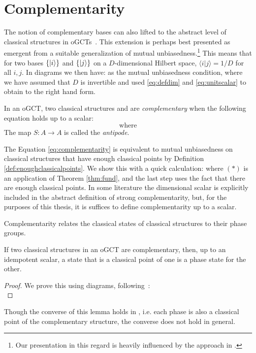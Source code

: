 \section{Complementarity}
The notion of complementary bases can also lifted to the abstract level of classical structures in oGCTs~\cite{coecke2011interacting}. This extension is perhaps best presented as emergent from a suitable generalization of mutual unbiasedness.\footnote{Our presentation in this regard is heavily influenced by the approach in \cite{coecke2015generalised}.}  This means that for two bases $\{| i \rangle\}$ and $\{| j \rangle\}$ on a $D$-dimensional Hilbert space, $\langle i|j\rangle = 1/D$ for all $i,j$. In diagrams we then have:
as the mutual unbiasedness condition, where we have assumed that $D$ is invertible and used \eqref{eq:defdim} and \eqref{eq:unitscalar} to obtain to the right hand form.
\begin{defn}[Complementarity]
\label{def:complementarity}
In an oGCT, two classical structures  and  are \emph{complementary} when the following equation holds up to a scalar:
\begin{equation}
\label{eq:complementarity}

\qquad \mbox{where} \qquad

\end{equation}
The map $S:A\to A$ is called the \emph{antipode}.
\end{defn}
The Equation \eqref{eq:complementarity} is equivalent to mutual unbiasedness on classical structures that have enough classical points by Definition \ref{def:enoughclassicalpoints}. We show this with a quick calculation:
where $(*)$ is an application of Theorem \ref{thm:fund}, and the last step uses the fact that there are enough classical points.  In some literature the dimensional scalar is explicitly included in the abstract definition of strong complementarity, but, for the purposes of this thesis, it is suffices to define complementarity up to a scalar. 

Complementarity relates the classical states of classical structures to their phase groups.
\begin{lemma}
\label{lem:phaseunbiased}
If two classical structures in an oGCT are complementary, then, up to an idempotent scalar, a state that is a classical point of one is a phase state for the other.
\end{lemma}
\begin{proof}
We prove this using diagrams, following~\cite{qcs-notes}:
\begin{equation}

\end{equation}
\end{proof}
Though the converse of this lemma holds in , i.e. each phase is also a classical point of the complementary structure, the converse does not hold in general.

